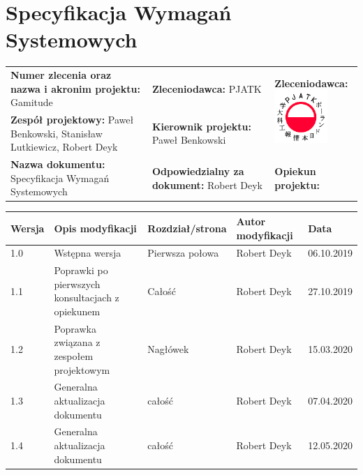 \documentclass[a4paper,11pt]{report}
\begin{document}
\chapter{Specyfikacja Wymagań Systemowych}
\begin{tabular}{|p{5cm}|p{5cm}|p{5cm}|}
\hline
\textbf{Numer zlecenia oraz nazwa i akronim projektu: } Gamitude &\textbf{Zleceniodawca: } PJATK & \multicolumn{1}{l|}{\multirow{2}{*}{\textbf{Zleceniodawca: }\newline
 \includegraphics[width=2cm, height=2cm]{image1.png} }}\\
\cline{1-2}
\textbf{Zespół projektowy: } Paweł Benkowski, Stanisław Lutkiewicz, Robert Deyk & \textbf{Kierownik projektu: } Paweł Benkowski &\\
\hline
\textbf{Nazwa dokumentu: } Specyfikacja Wymagań Systemowych & \textbf{Odpowiedzialny za dokument: } Robert Deyk &\textbf{Opiekun projektu: } \\
\hline
\end{tabular}
\vspace{1cm}
\begin{tabular}{|p{2.5cm}|p{3cm}|p{3cm}|p{2.5cm}|p{2.5cm}|}
\hline
\textbf{Wersja} & \textbf{Opis modyfikacji} & \textbf{Rozdział/strona} & \textbf{Autor modyfikacji} & \textbf{Data}\\
\hline
1.0 & Wstępna wersja & Pierwsza połowa & Robert Deyk & 06.10.2019\\
\hline
1.1 & Poprawki po pierwszych konsultacjach z opiekunem & Całość & Robert Deyk & 27.10.2019\\
\hline
1.2 & Poprawka związana z zespołem projektowym & Nagłówek & Robert Deyk & 15.03.2020\\
\hline
1.3 & Generalna aktualizacja dokumentu & całość & Robert Deyk & 07.04.2020\\
\hline
1.4 & Generalna aktualizacja dokumentu & całość & Robert Deyk & 12.05.2020\\
\hline
\end{tabular}
\end{document}
